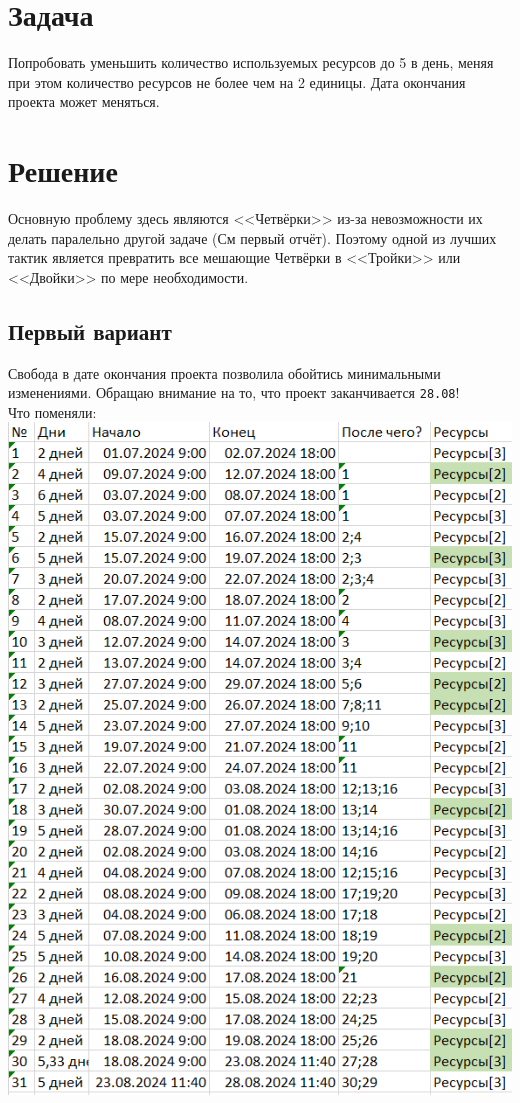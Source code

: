 \documentclass[14pt]{article}
\begin{document}
\section{Задача}
	Попробовать уменьшить количество используемых ресурсов до 5 в день,
		меняя при этом количество ресурсов не более чем на 2 единицы.
	Дата окончания проекта может меняться.
\section{Решение}
	Основную проблему здесь являются <<Четвёрки>> из-за невозможности их делать паралельно другой задаче (См первый отчёт).
	Поэтому одной из лучших тактик является превратить все мешающие Четвёрки в <<Тройки>> или <<Двойки>> по мере необходимости.
		\subsection{Первый вариант}
		Свобода в дате окончания проекта позволила обойтись минимальными изменениями.
		Обращаю внимание на то, что проект заканчивается \texttt{28.08}!\\
		{\LARGE Что поменяли:}\\
		\includegraphics[height=0.6\textheight]{../img/2b1_days_change.png}\\ 
\end{document}
